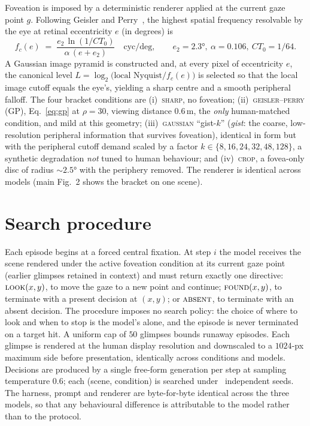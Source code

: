\documentclass[runningheads]{llncs}
\begin{document}
Foveation is imposed by a deterministic renderer applied at the current gaze point $g$. Following Geisler
and Perry~\cite{geisler1998foveation}, the highest spatial frequency resolvable by the eye at retinal
eccentricity $e$ (in degrees) is
\begin{equation}
f_c(e) \;=\; \frac{e_2\,\ln(1/CT_0)}{\alpha\,(e+e_2)}\quad\text{cyc/deg},\qquad
e_2{=}2.3°,\ \alpha{=}0.106,\ CT_0{=}1/64 .
\label{eq:gp}
\end{equation}
A Gaussian image pyramid is constructed and, at every pixel of eccentricity $e$, the canonical level
$L=\log_2\!\big(\text{local Nyquist}/f_c(e)\big)$ is selected so that the local image cutoff equals the
eye's, yielding a sharp centre and a smooth peripheral falloff. The four bracket conditions are
(i)~\textsc{sharp}, no foveation; (ii)~\textsc{geisler--perry} (GP), Eq.~\eqref{eq:gp} at $\rho{=}30$,
viewing distance $0.6$\,m, the \emph{only} human-matched condition, and mild at this geometry;
(iii)~\textsc{gaussian} ``gist-$k$'' (\emph{gist}: the coarse, low-resolution peripheral information that survives foveation), identical in form but with the peripheral cutoff demand scaled by a
factor $k\in\{8,16,24,32,48,128\}$, a synthetic degradation \emph{not} tuned to human behaviour; and
(iv)~\textsc{crop}, a fovea-only disc of radius $\sim$$2.5°$ with the periphery removed. The renderer is
identical across models (main Fig.~2 shows the bracket on one scene).
 
 
\section{Search procedure}\label{sec:proc}
Each episode begins at a forced central fixation. At step $i$ the model receives the scene rendered under
the active foveation condition at its current gaze point (earlier glimpses retained in context) and must
return exactly one directive: $\textsc{look}(x,y)$, to move the gaze to a new point and continue;
$\textsc{found}(x,y)$, to terminate with a present decision at $(x,y)$; or $\textsc{absent}$, to terminate
with an absent decision. The procedure imposes no search policy: the choice of where to look and when to
stop is the model's alone, and the episode is never terminated on a target hit. A uniform cap of $50$
glimpses bounds runaway episodes. Each glimpse is rendered at the human display resolution and downscaled
to a $1024$-px maximum side before presentation, identically across conditions and models. Decisions are
produced by a single free-form generation per step at sampling temperature $0.6$; each (scene,
condition) is searched under \NSeeds\ independent seeds. The harness, prompt and renderer are byte-for-byte
identical across the three models, so that any behavioural difference is attributable to the model rather
than to the protocol.
 
\end{document}
